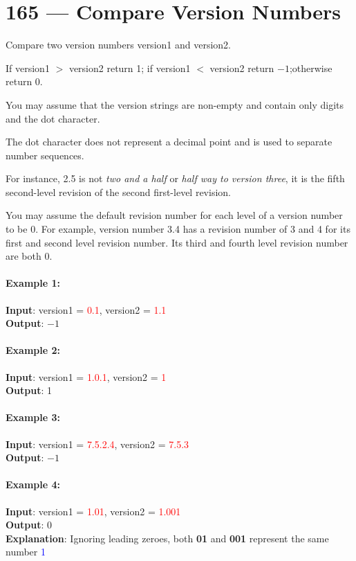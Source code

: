 \section{165 --- Compare Version Numbers}
Compare two version numbers version1  and version2.
\par
If version1 $>$ version2 return 1; if version1 $<$ version2 return $-1$;otherwise return 0.
\par
You may assume that the version strings are non-empty and contain only digits and the dot character.
\par
The dot character does not represent a decimal point and is used to separate number sequences.
\par
For instance, 2.5 is not \textit{two and a half} or \textit{half way to version three}, it is the fifth second-level revision of the second first-level revision.
\par
You may assume the default revision number for each level of a version number to be 0. For example, version number 3.4 has a revision number of 3 and 4 for its first and second level revision number. Its third and fourth level revision number are both 0.
\paragraph{Example 1:}
\begin{flushleft}
\textbf{Input}: version1 = \textcolor{red}{0.1}, version2 = \textcolor{red}{1.1}
\\
\textbf{Output}: $-1$
\end{flushleft}
\paragraph{Example 2:}
\begin{flushleft}
\textbf{Input}: version1 = \textcolor{red}{1.0.1}, version2 = \textcolor{red}{1}
\\
\textbf{Output}: 1
\end{flushleft}
\paragraph{Example 3:}
\begin{flushleft}
\textbf{Input}: version1 = \textcolor{red}{7.5.2.4}, version2 = \textcolor{red}{7.5.3}
\\
\textbf{Output}: $-1$
\end{flushleft}
\paragraph{Example 4:}
\begin{flushleft}
\textbf{Input}: version1 = \textcolor{red}{1.01}, version2 = \textcolor{red}{1.001}
\\
\textbf{Output}: 0
\\
\textbf{Explanation}: Ignoring leading zeroes, both \textbf{01} and \textbf{001} represent the same number \textcolor{blue}{1}
\end{flushleft}
